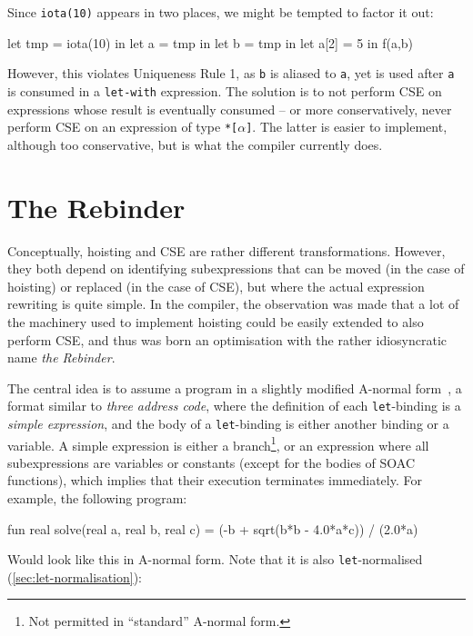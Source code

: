 Since \texttt{iota(10)} appears in two places, we might be tempted to
factor it out:

\begin{colorcode}
let tmp = iota(10) in
let a = tmp in
let b = tmp in
let a[2] = 5 in
f(a,b)
\end{colorcode}

However, this violates Uniqueness Rule 1, as \texttt{b} is aliased to
\texttt{a}, yet is used after \texttt{a} is consumed in a
\texttt{let-with} expression.  The solution is to not perform CSE on
expressions whose result is eventually consumed -- or more
conservatively, never perform CSE on an expression of type
\texttt{*[$\alpha$]}.  The latter is easier to implement, although too
conservative, but is what the \LO{} compiler currently does.

\section{The Rebinder}
\label{sec:rebinder}

Conceptually, hoisting and CSE are rather different transformations.
However, they both depend on identifying subexpressions that can be
moved (in the case of hoisting) or replaced (in the case of CSE), but
where the actual expression rewriting is quite simple.  In the \LO{}
compiler, the observation was made that a lot of the machinery used to
implement hoisting could be easily extended to also perform CSE, and
thus was born an optimisation with the rather idiosyncratic name
\textit{the Rebinder}.

The central idea is to assume a program in a slightly modified
A-normal form~\cite{Sabry:1992:RPC:141478.141563}, a format similar to
\textit{three address code}, where the definition of each
\texttt{let}-binding is a \textit{simple expression}, and the body of
a \texttt{let}-binding is either another binding or a variable.  A
simple expression is either a branch\footnote{Not permitted in
  ``standard'' A-normal form.}, or an expression where all
subexpressions are variables or constants (except for the bodies of
SOAC functions), which implies that their execution terminates
immediately.  For example, the following program:

\begin{colorcode}
fun real solve(real a, real b, real c) =
  (-b + sqrt(b*b - 4.0*a*c)) / (2.0*a)
\end{colorcode}

Would look like this in A-normal form.  Note that it is also
\texttt{let}-normalised (\cref{sec:let-normalisation}):

